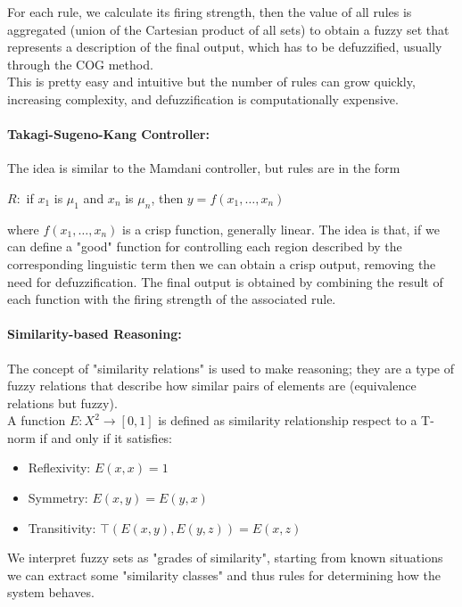 For each rule, we calculate its firing strength, then the value of all rules is aggregated (union of the Cartesian product of all sets) to obtain a fuzzy set that represents a description of the final output, which has to be defuzzified, usually through the COG method.\\

This is pretty easy and intuitive but the number of rules can grow quickly, increasing complexity, and defuzzification is computationally expensive.\\

\paragraph{Takagi-Sugeno-Kang Controller:} The idea is similar to the Mamdani controller, but rules are in the form
\begin{center}
	$R:$ if $x_1$ is $\mu_1$ and $x_n$ is $\mu_n$, then $y = f(x_1, \dots , x_n)$ 
\end{center}
where $f(x_1, \dots , x_n)$ is a crisp function, generally linear. The idea is that, if we can define a "good" function for controlling each region described by the corresponding linguistic term then we can obtain a crisp output, removing the need for defuzzification. The final output is obtained by combining the result of each function with the firing strength of the associated rule.\\

\paragraph{Similarity-based Reasoning:} The concept of "similarity relations" is used to make reasoning; they are a type of fuzzy relations that describe how similar pairs of elements are (equivalence relations but fuzzy). \\

A function $E:X^2 \rightarrow [0,1]$ is defined as similarity relationship respect to a T-norm if and only if it satisfies:
\begin{itemize}
	\item Reflexivity: $E(x,x) = 1$ 
	\item Symmetry: $E(x,y) = E(y,x)$
	\item Transitivity: $\top (E(x,y),E(y,z)) = E(x,z)$
\end{itemize}

We interpret fuzzy sets as "grades of similarity", starting from known situations we can extract some "similarity classes" and thus rules for determining how the system behaves.\\

